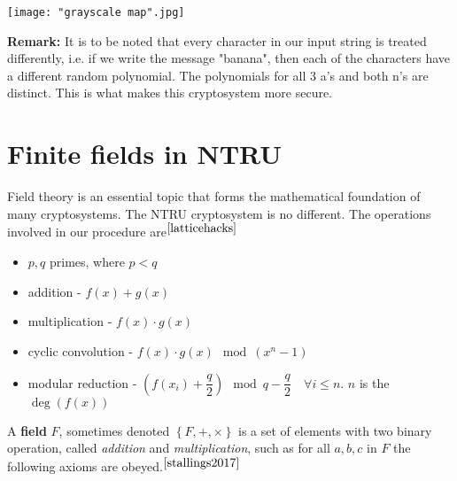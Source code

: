 \documentclass[a4paper,12pt]{article}
\begin{document}
\begin{center}
	\texttt{[image: "grayscale map".jpg]}
\end{center}

\begin{flushleft}
\textbf{Remark:} It is to be noted that every character in our input string is treated differently, i.e. if we write the message "banana", then each of the characters have a different random polynomial. The polynomials for all 3 a's and both n's are distinct. This is what makes this cryptosystem more secure.
\end{flushleft}

\section{Finite fields in NTRU}
\begin{flushleft}
Field theory is an essential topic that forms the mathematical foundation of many cryptosystems. The NTRU cryptosystem is no different. The operations involved in our procedure are$^{\cite{latticehacks}}$

\begin{itemize}
	\item $p,q$ primes, where $p<q$
	\item addition - $f(x)+g(x)$
	\item multiplication - $f(x)\cdot g(x)$
	\item cyclic convolution - $f(x)\cdot g(x) \mod (x^n-1)$
	\item modular reduction - $\left(f(x_i)+\dfrac q2\right)\mod q - \dfrac q2 \quad \forall i\le n$. $n$ is the $\deg(f(x))$
\end{itemize}
\end{flushleft}

\begin{flushleft}
A \textbf{field} $F$, sometimes denoted $\left\{F,+,\times\right\}$ is a set of elements with two binary operation, called \textit{addition} and \textit{multiplication}, such as for all $a,b,c$ in $F$ the following axioms are obeyed.$^{\cite{stallings2017}}$
\end{flushleft}
\end{document}
